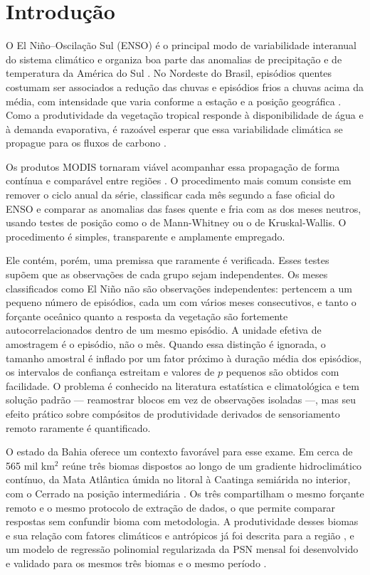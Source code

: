 \documentclass[a4paper,fleqn]{cas-sc}
\begin{document}
\section{Introdução}

O El Niño--Oscilação Sul (ENSO) é o principal modo de variabilidade interanual do sistema climático e organiza boa parte das anomalias de precipitação e de temperatura da América do Sul \citep{ropelewski1987, trenberth1997, grimm2003, grimm2009}. No Nordeste do Brasil, episódios quentes costumam ser associados a redução das chuvas e episódios frios a chuvas acima da média, com intensidade que varia conforme a estação e a posição geográfica \citep{kayano2007, marengo2018}. Como a produtividade da vegetação tropical responde à disponibilidade de água e à demanda evaporativa, é razoável esperar que essa variabilidade climática se propague para os fluxos de carbono \citep{zhao2010, nemani2003}.

Os produtos MODIS tornaram viável acompanhar essa propagação de forma contínua e comparável entre regiões \citep{running2004, running2021gpp}. O procedimento mais comum consiste em remover o ciclo anual da série, classificar cada mês segundo a fase oficial do ENSO e comparar as anomalias das fases quente e fria com as dos meses neutros, usando testes de posição como o de Mann-Whitney ou o de Kruskal-Wallis. O procedimento é simples, transparente e amplamente empregado.

Ele contém, porém, uma premissa que raramente é verificada. Esses testes supõem que as observações de cada grupo sejam independentes. Os meses classificados como El Niño não são observações independentes: pertencem a um pequeno número de episódios, cada um com vários meses consecutivos, e tanto o forçante oceânico quanto a resposta da vegetação são fortemente autocorrelacionados dentro de um mesmo episódio. A unidade efetiva de amostragem é o episódio, não o mês. Quando essa distinção é ignorada, o tamanho amostral é inflado por um fator próximo à duração média dos episódios, os intervalos de confiança estreitam e valores de $p$ pequenos são obtidos com facilidade. O problema é conhecido na literatura estatística e climatológica \citep{kunsch1989, politis1994} e tem solução padrão --- reamostrar blocos em vez de observações isoladas ---, mas seu efeito prático sobre compósitos de produtividade derivados de sensoriamento remoto raramente é quantificado.

O estado da Bahia oferece um contexto favorável para esse exame. Em cerca de 565 mil km$^2$ reúne três biomas dispostos ao longo de um gradiente hidroclimático contínuo, da Mata Atlântica úmida no litoral à Caatinga semiárida no interior, com o Cerrado na posição intermediária \citep{ibge2019, alvares2013}. Os três compartilham o mesmo forçante remoto e o mesmo protocolo de extração de dados, o que permite comparar respostas sem confundir bioma com metodologia. A produtividade desses biomas e sua relação com fatores climáticos e antrópicos já foi descrita para a região \citep{benfica2022, benfica2023}, e um modelo de regressão polinomial regularizada da PSN mensal foi desenvolvido e validado para os mesmos três biomas e o mesmo período \citep{oliveira2026}.
\end{document}
